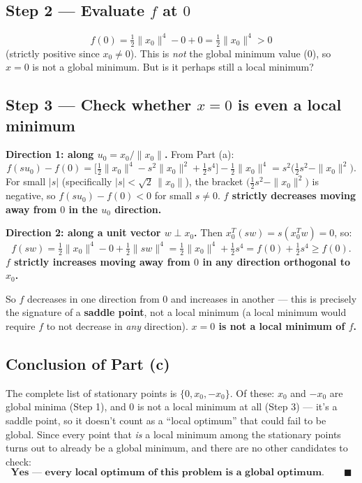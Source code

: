 \documentclass[11pt]{article}
\begin{document}
\subsection*{Step 2 --- Evaluate $f$ at $0$}

\[
f(0) = \tfrac12\|x_0\|^4 - 0 + 0 = \tfrac12\|x_0\|^4 > 0
\]
(strictly positive since $x_0\ne0$). This is \emph{not} the global minimum value ($0$), so $x=0$ is not a global minimum. But is it perhaps still a local minimum?

\subsection*{Step 3 --- Check whether $x=0$ is even a local minimum}

\textbf{Direction 1: along $u_0=x_0/\|x_0\|$.} From Part (a):
\[
f(su_0) - f(0) = \big[\tfrac12\|x_0\|^4 - s^2\|x_0\|^2+\tfrac12s^4\big] - \tfrac12\|x_0\|^4 = s^2\Big(\tfrac12s^2 - \|x_0\|^2\Big).
\]
For small $|s|$ (specifically $|s|<\sqrt2\,\|x_0\|$), the bracket $\big(\tfrac12s^2-\|x_0\|^2\big)$ is negative, so $f(su_0)-f(0) < 0$ for small $s\ne0$. \textbf{$f$ strictly decreases moving away from $0$ in the $u_0$ direction.}

\textbf{Direction 2: along a unit vector $w\perp x_0$.} Then $x_0^T(sw) = s(x_0^Tw) = 0$, so:
\[
f(sw) = \tfrac12\|x_0\|^4 - 0 + \tfrac12\|sw\|^4 = \tfrac12\|x_0\|^4+\tfrac12s^4 = f(0) + \tfrac12s^4 \ge f(0).
\]
\textbf{$f$ strictly increases moving away from $0$ in any direction orthogonal to $x_0$.}

So $f$ decreases in one direction from $0$ and increases in another --- this is precisely the signature of a \textbf{saddle point}, not a local minimum (a local minimum would require $f$ to not decrease in \emph{any} direction). \textbf{$x=0$ is not a local minimum of $f$.}

\subsection*{Conclusion of Part (c)}

The complete list of stationary points is $\{0,x_0,-x_0\}$. Of these: $x_0$ and $-x_0$ are global minima (Step 1), and $0$ is not a local minimum at all (Step 3) --- it's a saddle point, so it doesn't count as a ``local optimum'' that could fail to be global. Since every point that \emph{is} a local minimum among the stationary points turns out to already be a global minimum, and there are no other candidates to check:
\[
\textbf{Yes --- every local optimum of this problem is a global optimum.} \qquad\blacksquare
\]
\end{document}
